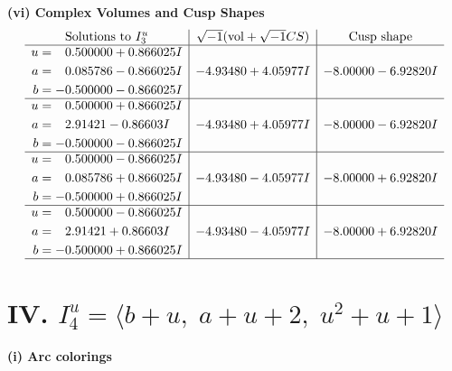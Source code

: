 \documentclass[1p]{elsarticle_modified}
\theoremstyle{definition}
\newcommand{\I}{\sqrt{-1}}
\begin{document}
\newpage\flushleft \textbf{(vi) Complex Volumes and Cusp Shapes}
$$\begin{array}{c|c|c}  
\text{Solutions to }I^u_{3}& \I (\text{vol} + \sqrt{-1}CS) & \text{Cusp shape}\\
 \hline 
\begin{aligned}
u &= \phantom{-}0.500000 + 0.866025 I \\
a &= \phantom{-}0.085786 - 0.866025 I \\
b &= -0.500000 - 0.866025 I\end{aligned}
 & -4.93480 + 4.05977 I & -8.00000 - 6.92820 I \\ \hline\begin{aligned}
u &= \phantom{-}0.500000 + 0.866025 I \\
a &= \phantom{-}2.91421 - 0.86603 I \\
b &= -0.500000 - 0.866025 I\end{aligned}
 & -4.93480 + 4.05977 I & -8.00000 - 6.92820 I \\ \hline\begin{aligned}
u &= \phantom{-}0.500000 - 0.866025 I \\
a &= \phantom{-}0.085786 + 0.866025 I \\
b &= -0.500000 + 0.866025 I\end{aligned}
 & -4.93480 - 4.05977 I & -8.00000 + 6.92820 I \\ \hline\begin{aligned}
u &= \phantom{-}0.500000 - 0.866025 I \\
a &= \phantom{-}2.91421 + 0.86603 I \\
b &= -0.500000 + 0.866025 I\end{aligned}
 & -4.93480 - 4.05977 I & -8.00000 + 6.92820 I\\
 \hline 
 \end{array}$$\newpage\newpage\renewcommand{\arraystretch}{1}
\centering \section*{IV. $I^u_{4}= \langle b+u,\;a+u+2,\;u^2+u+1 \rangle$}
\flushleft \textbf{(i) Arc colorings}\\
\end{document}
